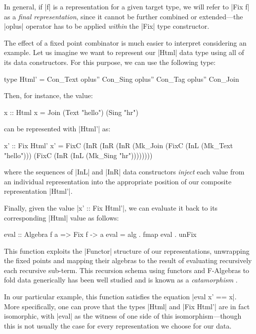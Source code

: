 In general, if |f| is a representation for a given target type, we will refer to
|Fix f| as a \emph{final representation}, since it cannot be further combined or
extended---the |oplus| operator has to be applied \emph{within} the |Fix| type
constructor.


The effect of a fixed point combinator is much easier to interpret considering
an example.
%
Let us imagine we want to represent our |Html| data type using all of its data
constructors.
%
For this purpose, we can use the following type:

\begin{code}
type Html' = Con_Text oplus'' Con_Sing oplus'' Con_Tag oplus'' Con_Join
\end{code}
%
Then, for instance, the value:

\begin{code}
  x :: Html
  x = Join (Text "hello") (Sing "hr")
\end{code}
%
can be represented with |Html'| as:

\begin{code}
  x' ::  Fix Html'
  x' =   FixC  (InR  (InR (InR (Mk_Join
               (FixC (InL (Mk_Text "hello")))
               (FixC (InR (InL (Mk_Sing "hr"))))))))
\end{code}
%
where the sequences of |InL| and |InR| data constructors \emph{inject} each
value from an individual representation into the appropriate position of our
composite representation |Html'|.


Finally, given the value |x' :: Fix Html'|, we can evaluate it back to its
corresponding |Html| value as follows:

\begin{code}
eval :: Algebra f a => Fix f -> a
eval = alg . fmap eval . unFix
\end{code}
%
This function exploits the |Functor| structure of our representations,
unwrapping the fixed points and mapping their algebras to the result of
evaluating recursively each recursive sub-term.
%
This recursion schema using functors and F-Algebras to fold data generically has
been well studied and is known as a \emph{catamorphism} \cite{Meijer91}.

In our particular example, this function satisfies the equation |eval x' == x|.
%
More specifically, one can prove that the types |Html| and |Fix Html'| are in
fact isomorphic, with |eval| as the witness of one side of this
isomorphism---though this is not usually the case for every representation we
choose for our data.


